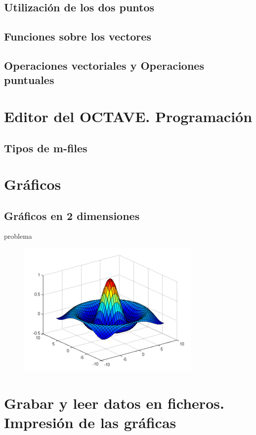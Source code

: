 \documentclass[a4,12pt]{article}
\begin{document}
\subsection{Utilización de los dos puntos}

\subsection{Funciones sobre los vectores}

\subsection{Operaciones vectoriales y Operaciones puntuales}

\section{Editor del OCTAVE. Programación}

\subsection{Tipos de m-files}

\section{Gráficos}

\subsection{Gráficos en 2 dimensiones}

problema
\begin{figure}
  \centering
    \includegraphics{graficos/octave}
\end{figure}

\section{Grabar y leer datos en ficheros. Impresión de las gráficas}
\end{document}
